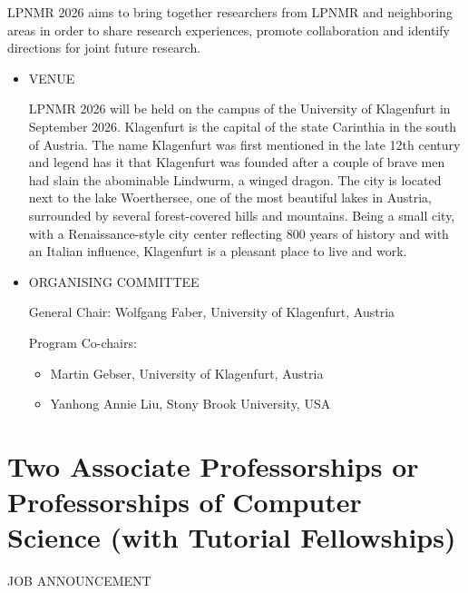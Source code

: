 \documentclass[prodmode,acmtecs]{acmsmall} %
\begin{document}
\begin{itemize}
\end{itemize}LPNMR 2026 aims to bring together researchers from LPNMR and neighboring areas in order to share research experiences, promote collaboration and identify directions for joint future research. 

\begin{itemize}\item  VENUE 
 
  LPNMR 2026 will be held on the campus of the University of Klagenfurt in September 2026. Klagenfurt is the capital of the state Carinthia in the south of Austria. The name Klagenfurt was first mentioned in the late 12th century and legend has it that Klagenfurt was founded after a couple of brave men had slain the abominable Lindwurm, a winged dragon. The city is located next to the lake Woerthersee, one of the most beautiful lakes in Austria, surrounded by several forest-covered hills and mountains. Being a small city, with a Renaissance-style city center reflecting 800 years of history and with an Italian influence, Klagenfurt is a pleasant place to live and work. 
 
\item  ORGANISING COMMITTEE 
 
  General Chair: Wolfgang Faber, University of Klagenfurt, Austria 
 
  Program Co-chairs: 
 
\begin{itemize}\item  Martin Gebser, University of Klagenfurt, Austria
\item  Yanhong Annie Liu, Stony Brook University, USA
\end{itemize} 
\end{itemize}\section{Two Associate Professorships or Professorships of Computer Science (with Tutorial Fellowships)}\label{TwoAssociateProfessorshipsorProfessorshipsofComputerSciencewithTutorialFellowships}JOB ANNOUNCEMENT 
\end{document}
